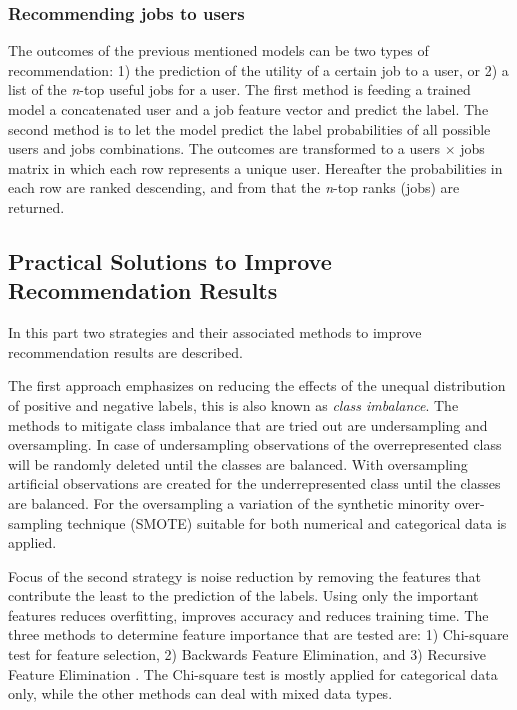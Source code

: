 \subsubsection{Recommending jobs to users}
The outcomes of the previous mentioned models can be two types of recommendation: 1) the prediction of the utility of a certain job to a user, or 2) a list of the \textit{n}-top useful jobs for a user.
The first method is feeding a trained model a concatenated user and a job feature vector and predict the label.
The second method is to let the model predict the label probabilities of all possible users and jobs combinations. 
The outcomes are transformed to a users $\times$ jobs matrix in which each row represents a unique user.
Hereafter the probabilities in each row are ranked descending, and from that the \textit{n}-top ranks (jobs) are returned. 

\subsection{Practical Solutions to Improve Recommendation Results}
\label{ssec:psirr}
In this part two strategies and their associated methods to improve recommendation results are described.

The first approach emphasizes on reducing the effects of the unequal distribution of positive and negative labels, this is also known as \textit{class imbalance}. 
The methods to mitigate class imbalance that are tried out are undersampling and oversampling. 
In case of undersampling observations of the overrepresented class will be randomly deleted until the classes are balanced. 
With oversampling artificial observations are created for the underrepresented class until the classes are balanced. 
For the oversampling a variation of the synthetic minority over-sampling technique (SMOTE) \cite{chawla2002smote} suitable for both numerical and categorical data is applied. 

Focus of the second strategy is noise reduction by removing the features that contribute the least to the prediction of the labels.
Using only the important features reduces overfitting, improves accuracy and reduces training time. 
The three methods to determine feature importance that are tested are: 1) Chi-square test for feature selection, 2) Backwards Feature Elimination, and 3) Recursive Feature Elimination \cite{guyon2002gene}. 
The Chi-square test is mostly applied for categorical data only, while the other methods can deal with mixed data types.

